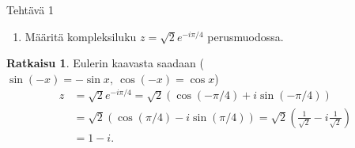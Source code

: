 \documentclass[12pt, a4paper, t]{beamer}
\date{}
\theoremstyle{exercise}
\theoremstyle{remark}
\theoremstyle{definition}
\newtheorem*{rat}{Ratkaisu}
\begin{document}


%
\begin{frame}{Tehtävä 1}

\vspace{12pt}
\begin{enumerate}[leftmargin=*, label=\alph*), topsep=0pt, itemsep=12pt, parsep=0pt, font=\bfseries\color{red}]
\item Määritä kompleksiluku $\displaystyle z=\sqrt{2}e^{-i\pi/4}$ perusmuodossa.

\end{enumerate}
\vspace{100pt}
\pause
\begin{rat}
Eulerin kaavasta saadaan ($\sin(-x)=-\sin x,\ \cos(-x)=\cos x$)
\begin{align*}
z&=\sqrt{2}e^{-i\pi/4}=\sqrt{2}\left(\cos(-\pi/4)+i\sin(-\pi/4)\right)\\
&=\sqrt{2}\left(\cos(\pi/4)-i\sin(\pi/4)\right)=\sqrt{2}\left(\frac{1}{\sqrt{2}}-i\frac{1}{\sqrt{2}}\right)\\
&=1-i.
\end{align*}
\end{rat}
\end{frame}
\end{document}
